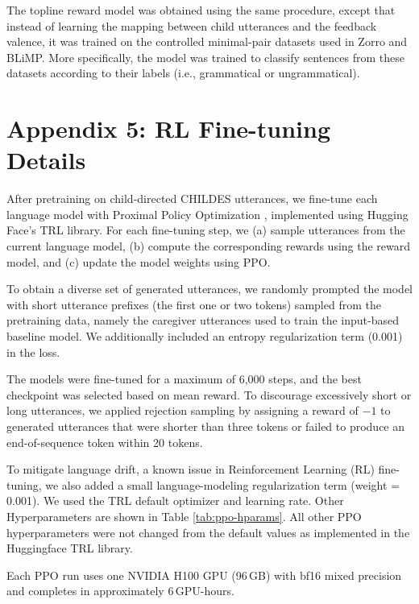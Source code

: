 The topline reward model was obtained using the same procedure, except that instead of learning the mapping between child utterances and the feedback valence, it was trained on the controlled minimal-pair datasets used in Zorro and BLiMP. More specifically, the model was trained to classify sentences from these datasets according to their labels (i.e., grammatical or ungrammatical).

\section*{Appendix 5: RL Fine-tuning Details}

After pretraining on child-directed CHILDES utterances, we fine-tune each language model with Proximal Policy Optimization \citep[PPO;][]{schulman_proximal_2017}, implemented using Hugging Face’s TRL library.
For each fine-tuning step, we (a) sample utterances from the current language model, (b) compute the corresponding rewards using the reward model, and (c) update the model weights using PPO.

To obtain a diverse set of generated utterances, we randomly prompted the model with short utterance prefixes (the first one or two tokens) sampled from the pretraining data, namely the caregiver utterances used to train the input-based baseline model.
We additionally included an entropy regularization term (0.001) in the loss. 

The models were fine-tuned for a maximum of 6,000 steps, and the best checkpoint was selected based on mean reward. To discourage excessively short or long utterances, we applied rejection sampling by assigning a reward of $-1$ to generated utterances that were shorter than three tokens or failed to produce an end-of-sequence token within 20 tokens.

To mitigate language drift, a known issue in Reinforcement Learning (RL) fine-tuning, we also added a small language-modeling regularization term (weight = 0.001). We used the TRL default optimizer and learning rate. Other Hyperparameters are shown in Table \ref{tab:ppo-hparams}. All other PPO hyperparameters were not changed from the default values as implemented in the Huggingface TRL library.


Each PPO run uses one NVIDIA H100 GPU (96\,GB) with bf16 mixed precision and completes in approximately \textsc{6}\,GPU-hours.



